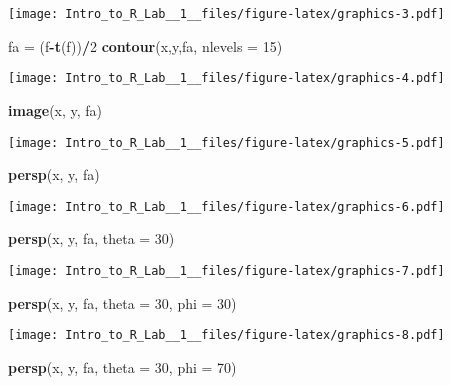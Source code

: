 \documentclass[]{article}
\newenvironment{Shaded}{\begin{snugshade}}{\end{snugshade}}
\newcommand{\KeywordTok}[1]{\textcolor[rgb]{0.13,0.29,0.53}{\textbf{#1}}}
\newcommand{\DataTypeTok}[1]{\textcolor[rgb]{0.13,0.29,0.53}{#1}}
\newcommand{\DecValTok}[1]{\textcolor[rgb]{0.00,0.00,0.81}{#1}}
\newcommand{\StringTok}[1]{\textcolor[rgb]{0.31,0.60,0.02}{#1}}
\newcommand{\OperatorTok}[1]{\textcolor[rgb]{0.81,0.36,0.00}{\textbf{#1}}}
\newcommand{\NormalTok}[1]{#1}
\begin{document}
\texttt{[image: Intro\_to\_R\_Lab\_\_1\_\_files/figure-latex/graphics-3.pdf]}

\begin{Shaded}
\begin{Highlighting}[]
\NormalTok{fa =}\StringTok{ }\NormalTok{(f}\OperatorTok{-}\KeywordTok{t}\NormalTok{(f))}\OperatorTok{/}\DecValTok{2}
\KeywordTok{contour}\NormalTok{(x,y,fa, }\DataTypeTok{nlevels =} \DecValTok{15}\NormalTok{)}
\end{Highlighting}
\end{Shaded}

\texttt{[image: Intro\_to\_R\_Lab\_\_1\_\_files/figure-latex/graphics-4.pdf]}

\begin{Shaded}
\begin{Highlighting}[]
\KeywordTok{image}\NormalTok{(x, y, fa)}
\end{Highlighting}
\end{Shaded}

\texttt{[image: Intro\_to\_R\_Lab\_\_1\_\_files/figure-latex/graphics-5.pdf]}

\begin{Shaded}
\begin{Highlighting}[]
\KeywordTok{persp}\NormalTok{(x, y, fa)}
\end{Highlighting}
\end{Shaded}

\texttt{[image: Intro\_to\_R\_Lab\_\_1\_\_files/figure-latex/graphics-6.pdf]}

\begin{Shaded}
\begin{Highlighting}[]
\KeywordTok{persp}\NormalTok{(x, y, fa, }\DataTypeTok{theta =} \DecValTok{30}\NormalTok{)}
\end{Highlighting}
\end{Shaded}

\texttt{[image: Intro\_to\_R\_Lab\_\_1\_\_files/figure-latex/graphics-7.pdf]}

\begin{Shaded}
\begin{Highlighting}[]
\KeywordTok{persp}\NormalTok{(x, y, fa, }\DataTypeTok{theta =} \DecValTok{30}\NormalTok{, }\DataTypeTok{phi =} \DecValTok{30}\NormalTok{)}
\end{Highlighting}
\end{Shaded}

\texttt{[image: Intro\_to\_R\_Lab\_\_1\_\_files/figure-latex/graphics-8.pdf]}

\begin{Shaded}
\begin{Highlighting}[]
\KeywordTok{persp}\NormalTok{(x, y, fa, }\DataTypeTok{theta =} \DecValTok{30}\NormalTok{, }\DataTypeTok{phi =} \DecValTok{70}\NormalTok{)}
\end{Highlighting}
\end{Shaded}
\end{document}
